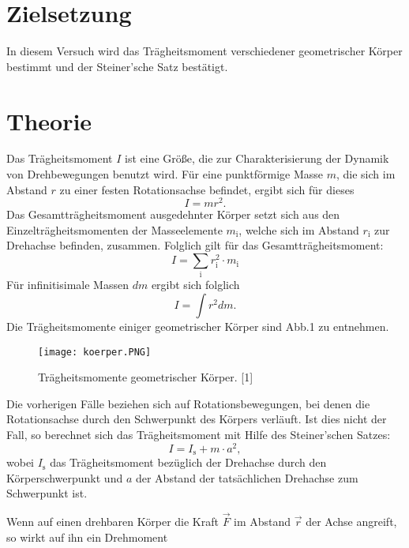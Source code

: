 \section{Zielsetzung}
\label{sec:Zielsetzung}
In diesem Versuch wird das Trägheitsmoment verschiedener
geometrischer Körper bestimmt und der Steiner'sche Satz bestätigt.



\section{Theorie}
\label{sec:Theorie}

Das Trägheitsmoment $I$ ist eine Größe, die zur Charakterisierung
der Dynamik von Drehbewegungen benutzt wird. Für eine
punktförmige Masse $m$, die sich im Abstand $r$ zu einer festen
Rotationsachse befindet, ergibt sich für dieses
\begin{equation}
I = mr^2.
\end{equation}
Das Gesamtträgheitsmoment ausgedehnter Körper setzt sich aus den
Einzelträgheitsmomenten der Masseelemente $m_{\text{i}}$,
welche sich im Abstand $r_{\text{i}}$ zur Drehachse befinden,
zusammen. Folglich gilt für das Gesamtträgheitsmoment:
\begin{equation}
I = \sum_{\text{i}} r_{\text{i}}^2 \cdot m_{\text{i}}
\end{equation}
Für infinitisimale Massen $dm$ ergibt sich folglich
\begin{equation}
I = \int r^2 dm.
\end{equation}
Die Trägheitsmomente einiger geometrischer Körper sind Abb.1 zu
entnehmen.
\begin{figure}
\centering
\caption{Trägheitsmomente geometrischer Körper. [1]}
\texttt{[image: koerper.PNG]}
\label{fig:koerper}
\end{figure}
Die vorherigen Fälle beziehen sich auf Rotationsbewegungen,
bei denen die Rotationsachse durch den Schwerpunkt des
Körpers verläuft. Ist dies nicht der Fall, so berechnet sich
das Trägheitsmoment mit Hilfe des Steiner'schen Satzes:
\begin{equation*}
I = I_{\text{s}} + m \cdot a^2,
\end{equation*}
wobei $I_{\text{s}}$ das Trägheitsmoment bezüglich der
Drehachse durch den Körperschwerpunkt und $a$ der Abstand der
tatsächlichen Drehachse zum Schwerpunkt ist.
\par
Wenn auf einen drehbaren Körper die Kraft $\vec{F}$ im Abstand
$\vec{r}$ der Achse angreift, so wirkt auf ihn ein Drehmoment
